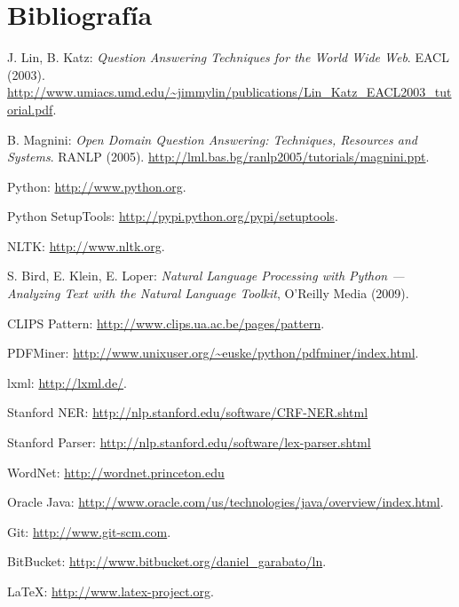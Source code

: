 \documentclass[12pt,a4paper,titlepage]{article}
\begin{document}
\clearpage
\section{Bibliografía}
\renewcommand{\section}[2]{}
\begin{thebibliography}{9}

J. Lin, B. Katz: \emph{Question Answering Techniques for the World Wide Web}. EACL (2003). \url{http://www.umiacs.umd.edu/~jimmylin/publications/Lin_Katz_EACL2003_tutorial.pdf}.

B. Magnini: \emph{Open Domain Question Answering: Techniques, Resources and Systems}. RANLP (2005). \url{http://lml.bas.bg/ranlp2005/tutorials/magnini.ppt}.

Python: \url{http://www.python.org}.

Python SetupTools: \url{http://pypi.python.org/pypi/setuptools}.

NLTK: \url{http://www.nltk.org}.

S. Bird, E. Klein, E. Loper: \emph{Natural Language Processing with Python --- Analyzing Text with the Natural Language Toolkit}, O'Reilly Media (2009).

CLIPS Pattern: \url{http://www.clips.ua.ac.be/pages/pattern}.

PDFMiner: \url{http://www.unixuser.org/~euske/python/pdfminer/index.html}.

lxml: \url{http://lxml.de/}.

Stanford NER: \url{http://nlp.stanford.edu/software/CRF-NER.shtml}

Stanford Parser: \url{http://nlp.stanford.edu/software/lex-parser.shtml}

WordNet: \url{http://wordnet.princeton.edu}

Oracle Java: \url{http://www.oracle.com/us/technologies/java/overview/index.html}.

Git: \url{http://www.git-scm.com}.

BitBucket: \url{http://www.bitbucket.org/daniel_garabato/ln}.

\LaTeX: \url{http://www.latex-project.org}.


\end{thebibliography}
\end{document}
